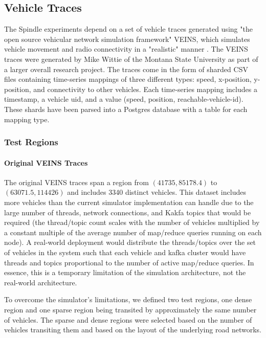 \documentclass{thesis}
\begin{document}
\subsection{Vehicle Traces}
   The Spindle experiments depend on a set of vehicle traces 
   generated using "the open source vehicular network simulation framework" VEINS, which simulates
   vehicle movement and radio connectivity in a "realistic" manner \cite{veins}. The VEINS traces
   were generated by Mike Wittie of the Montana State University as part of a larger overall research
   project. 
   The traces come in the form of sharded CSV files containing time-series mappings of three different types:
   speed, x-position, y-position, and connectivity to other vehicles. Each time-series mapping includes
   a timestamp, a vehicle uid, and a value (speed, position, reachable-vehicle-id). 
   These shards have been parsed into a Postgres database with a table for each mapping type.
\subsubsection{Test Regions} %
    \paragraph{Original VEINS Traces}
        The original VEINS traces span a region from $(41735, 85178.4)$ to $(63071.5, 114426)$ and includes 3340 distinct
        vehicles. This dataset includes more vehicles than the current simulator implementation can handle due to the large
        number of threads, network connections, and Kakfa topics that would be required (the thread/topic count scales with the
        number of vehicles multiplied by a constant multiple of the average number of map/reduce queries running on each node).
        A real-world deployment would distribute the threads/topics over the set of vehicles in the system such that each
        vehicle and kafka cluster would have threads and topics proportional to the number of active map/reduce queries.
        In essence, this is a temporary limitation of the simulation architecture, not the real-world architecture.

        To overcome the simulator's limitations, we defined two test regions, one dense region and one sparse region
        being transited by approximately the same number of vehicles. The sparse and dense regions were selected based
        on the number of vehicles transiting them and based on the layout of the underlying road networks.
\end{document}

